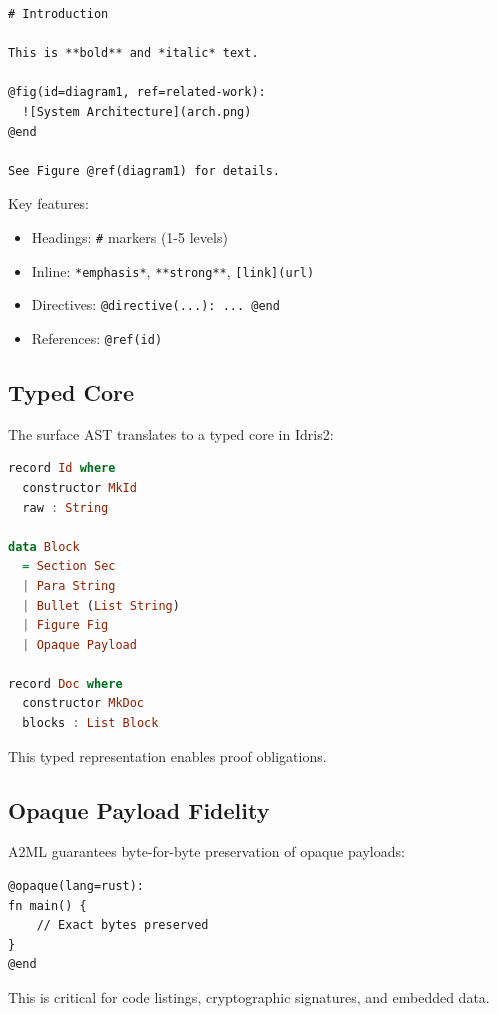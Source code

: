 \documentclass[10pt,twocolumn]{article}
\begin{document}
\begin{lstlisting}[language=A2ML]
# Introduction

This is **bold** and *italic* text.

@fig(id=diagram1, ref=related-work):
  ![System Architecture](arch.png)
@end

See Figure @ref(diagram1) for details.
\end{lstlisting}

Key features:
\begin{itemize}
  \item Headings: \texttt{\#} markers (1-5 levels)
  \item Inline: \texttt{*emphasis*}, \texttt{**strong**}, \texttt{[link](url)}
  \item Directives: \texttt{@directive(...): ... @end}
  \item References: \texttt{@ref(id)}
\end{itemize}

\subsection{Typed Core}

The surface AST translates to a typed core in Idris2:

\begin{lstlisting}[language=Haskell]
record Id where
  constructor MkId
  raw : String

data Block
  = Section Sec
  | Para String
  | Bullet (List String)
  | Figure Fig
  | Opaque Payload

record Doc where
  constructor MkDoc
  blocks : List Block
\end{lstlisting}

This typed representation enables proof obligations.

\subsection{Opaque Payload Fidelity}

A2ML guarantees byte-for-byte preservation of opaque payloads:

\begin{lstlisting}[language=A2ML]
@opaque(lang=rust):
fn main() {
    // Exact bytes preserved
}
@end
\end{lstlisting}

\noindent This is critical for code listings, cryptographic signatures, and embedded data.
\end{document}
